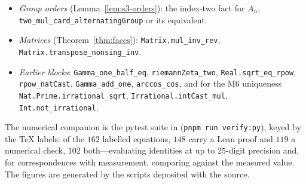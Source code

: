 \begin{itemize}
  differ only at $B_1$ and agree at every even index $\ge2$, so the statement is the same either
  way; the identifier is not.
\item \emph{Group orders} (Lemma~\ref{lem:s3-orders}): the index-two fact for $A_n$,
  \texttt{two\_mul\_card\_alternatingGroup} or its equivalent.
\item \emph{Matrices} (Theorem~\ref{thm:faces}): \texttt{Matrix.mul\_inv\_rev},
  \texttt{Matrix.transpose\_nonsing\_inv}.
\item \emph{Earlier blocks}: \texttt{Gamma\_one\_half\_eq}, \texttt{riemannZeta\_two},
  \texttt{Real.sqrt\_eq\_rpow}, \texttt{rpow\_natCast}, \texttt{Gamma\_add\_one},
  \texttt{arccos\_cos}, and for the M6 uniqueness \texttt{Nat.Prime.irrational\_sqrt},
  \texttt{Irrational.intCast\_mul}, \texttt{Int.not\_irrational}.
\end{itemize}
\noindent The numerical companion is the pytest suite in  (\texttt{pnpm run verify:py}),
keyed by the \TeX{} labels: of the $162$ labelled equations, $148$ carry a Lean proof and $119$ a numerical check, $102$ both---evaluating identities at up to $25$-digit precision and, for correspondences with measurement, comparing against the measured value. The figures are generated by the scripts deposited with the source.
